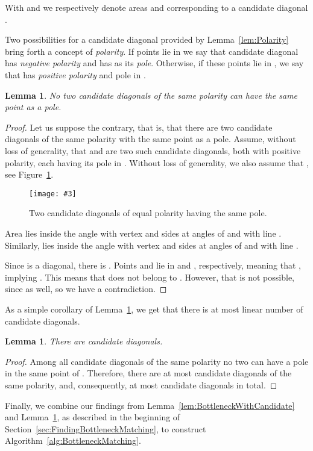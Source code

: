 \documentclass[a4paper, 11pt]{article}
\newtheorem{lemma}[theorem]{Lemma}
\newcommand{\fig}[3]{
	\begin{figure}[ht]
		\centering
		\texttt{[image: \#3]}
		\caption{#2}
		\label{#1}
	\end{figure}
}
\begin{document}
With  and  we respectively denote areas  and  corresponding to a candidate diagonal .

Two possibilities for a candidate diagonal  provided by Lemma~\ref{lem:Polarity} bring forth a concept of \emph{polarity}. If points  lie in  we say that candidate diagonal  has \emph{negative polarity} and has  as its \emph{pole}. Otherwise, if these points lie in , we say that  has \emph{positive polarity} and pole in .


\begin{lemma}
	\label{lem:CandidatesDontTouch}
	No two candidate diagonals of the same polarity can have the same point as a pole.
\end{lemma}
\begin{proof}
	Let us suppose the contrary, that is, that there are two candidate diagonals of the same polarity with the same point as a pole. Assume, without loss of generality, that  and  are two such candidate diagonals, both with positive polarity, each having its pole in . Without loss of generality, we also assume that , see Figure~\ref{fig:CandidatesDontTouch}.	
	
	\fig{fig:CandidatesDontTouch}{Two candidate diagonals of equal polarity having the same pole.}{CandidatesNoTouching.pdf}
	
	Area  lies inside the angle with vertex  and sides at angles of  and  with line . Similarly,  lies inside the angle with vertex  and sides at angles of  and  with line .
		
	Since  is a diagonal, there is .	Points  and  lie in  and , respectively, meaning that , implying . This means that  does not belong to . However, that is not possible, since  as well, so we have a contradiction.
\end{proof}

As a simple corollary of Lemma~\ref{lem:CandidatesDontTouch}, we get that there is at most linear number of candidate diagonals.

\begin{lemma}
	\label{lem:FewCandidates}
	There are  candidate diagonals.
\end{lemma}
\begin{proof}
	Among all candidate diagonals of the same polarity no two can have a pole in the same point of . Therefore, there are at most  candidate diagonals of the same polarity, and, consequently, at most  candidate diagonals in total.
\end{proof}


Finally, we combine our findings from Lemma~\ref{lem:BottleneckWithCandidate} and Lemma~\ref{lem:FewCandidates}, as described in the beginning of Section~\ref{sec:FindingBottleneckMatching}, to construct Algorithm~\ref{alg:BottleneckMatching}.
\end{document}
